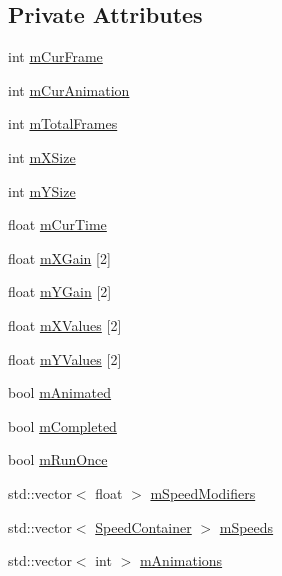 \subsection*{Private Attributes}
\begin{DoxyCompactItemize}
\item 
int \hyperlink{classTextureCoordinates_af29e0d73ed3545bbb9dd6d26dc066fce}{m\+Cur\+Frame}
\item 
int \hyperlink{classTextureCoordinates_af453ba67ea3aea6d092460912be93ba8}{m\+Cur\+Animation}
\item 
int \hyperlink{classTextureCoordinates_a54c70b943f6f15c0cec44083fd16e9c9}{m\+Total\+Frames}
\item 
int \hyperlink{classTextureCoordinates_acf2542d7962a922434b6593f10306d6c}{m\+X\+Size}
\item 
int \hyperlink{classTextureCoordinates_a7e4c7432174c1d2c3e7e914e16f4171b}{m\+Y\+Size}
\item 
float \hyperlink{classTextureCoordinates_ad57ba42126e143406ec1998b815c3548}{m\+Cur\+Time}
\item 
float \hyperlink{classTextureCoordinates_a611cbb70c81161901bbcab2b745f88c2}{m\+X\+Gain} \mbox{[}2\mbox{]}
\item 
float \hyperlink{classTextureCoordinates_a9cb838e1422e28a00af0d2e0d921f26f}{m\+Y\+Gain} \mbox{[}2\mbox{]}
\item 
float \hyperlink{classTextureCoordinates_ada230a3fd2448aa22c23eb20f2f947fd}{m\+X\+Values} \mbox{[}2\mbox{]}
\item 
float \hyperlink{classTextureCoordinates_a1857ab9e774582ad6a361070d26e89d9}{m\+Y\+Values} \mbox{[}2\mbox{]}
\item 
bool \hyperlink{classTextureCoordinates_a6eeded846dbc9d81e00b1655f1b9ade3}{m\+Animated}
\item 
bool \hyperlink{classTextureCoordinates_a8396ffb31c761b74491873dfc651dd6d}{m\+Completed}
\item 
bool \hyperlink{classTextureCoordinates_a9386ec329ac8d1f4bd1050dee541c84a}{m\+Run\+Once}
\item 
std\+::vector$<$ float $>$ \hyperlink{classTextureCoordinates_a710c4627d95401d092248edd0526700d}{m\+Speed\+Modifiers}
\item 
std\+::vector$<$ \hyperlink{classTextureCoordinates_adc1028525067f031d0b01f61d5e54ac9}{Speed\+Container} $>$ \hyperlink{classTextureCoordinates_a6c5228a4c97ed8520208c2931b782cd5}{m\+Speeds}
\item 
std\+::vector$<$ int $>$ \hyperlink{classTextureCoordinates_a382769309d5507f05ec11ee75acac1f3}{m\+Animations}
\end{DoxyCompactItemize}


